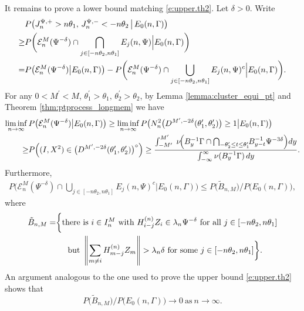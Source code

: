 \documentclass[11pt,reqno]{amsart}
\numberwithin{equation}{section}
\theoremstyle{definition}
\theoremstyle{remark}
\theoremstyle{definition}
\newcommand{\cE}{\mathcal{E}}
\begin{document}
It remains to prove a lower bound matching \eqref{e:upper.th2}. Let
$\delta>0$. Write
\begin{align} \label{e:split.lower.cl}
    & P\big(J_n^{\Psi,+} > n\theta_1,\, J_n^{\Psi,-} < -n\theta_2 \,\big|\, E_0(n,\Gamma)\big) \\
       \geq  &   P\bigg(\cE_n^M(\Psi^{-\delta})\cap \bigcap_{j \in [-n\theta_2,n\theta_1]}
               E_j(n, \Psi) \Big|E_0(n,\Gamma) \biggr) \notag \\
=& P\bigl( \cE_n^M(\Psi^{-\delta}) \big|E_0(n,\Gamma)\bigr) - P\bigg(\cE_n^M(\Psi^{-\delta})\cap \bigcup_{j \in [-n\theta_2,n\theta_1]}
               E_j(n, \Psi)^c \Big|E_0(n,\Gamma)\biggr). \notag 
\end{align}
For any 
$0<M^\prime <M$, $   \theta_1^\prime>\theta_1, \,
\theta_2^\prime>\theta_2$, by Lemma \ref{lemma:cluster_equi_pt} and
Theorem \ref{thm:ptprocess_longmem} we have 
\begin{align} \label{e:limi.E}
\liminf_{n\to\infty} \, &P\bigl(  \cE_n^M(\Psi^{-\delta})\big|E_0(n,\Gamma)\bigr)
\geq \liminf_{n\to\infty} P\bigl(N_n^2\bigl(D^{M^\prime,{-2\delta}}(\theta_1^\prime, \theta_2^\prime)\bigr)
    \geq 1\big|E_0(n,\Gamma)\bigr) \\
\notag \geq &P\Bigl( (I,X^2)\in \bigl( D^{M^\prime,-2\delta}(\theta_1^\prime, \theta_2^\prime)\bigr)^\circ\Bigr)
\geq  \frac{\int_{-M^\prime}^{M^\prime}  \;
        \nu\!\Big(B_y^{-1} \Gamma \cap \bigcap_{-\theta_2^\prime\le t \le \theta_1^\prime} \!\!  B_{y-t}^{-1}\Psi^{-3\delta}\Big) dy}
        {\int_{-\infty}^\infty \nu(B_y^{-1} \Gamma) \,dy} .
\end{align}
Furthermore,
\begin{align*}
P\bigg(\cE_n^M(\Psi^{-\delta})\cap \bigcup_{j \in [-n\theta_2,n\theta_1]}
               E_j(n, \Psi)^c \Big|E_0(n,\Gamma)\biggr) \leq P\bigl(
  \tilde B_{n,M}\bigr)/P\bigl( E_0(n,\Gamma)\bigr),
\end{align*}
where
\begin{align*}
\tilde B_{n,M} =&\bigg\{ \text{there is} \ i\in I_n^M \ \text{with} \ H_{i-j}^{(n)}Z_i\in
  \lambda_n \Psi^{-\delta } \ \text{for all} \ 
  j\in [-n\theta_2,n\theta_1]   \\
&\hskip 0.2 in\text{but} \ \left\| \sum_{m\not= i}
  H_{m-j}^{(n)}Z_m \right\| > \lambda_n \delta \ \text{for some} \ j \in
  [-n\theta_2,n\theta_1]\bigg\}. 
\end{align*}
An argument analogous to the one used to prove the upper bound
\eqref{e:upper.th2} shows that
$$
P\bigl(
  \tilde B_{n,M}\bigr)/P\bigl( E_0(n,\Gamma)\bigr)\to 0 \ \text{as} \
  n\to\infty.
  $$
\end{document}

